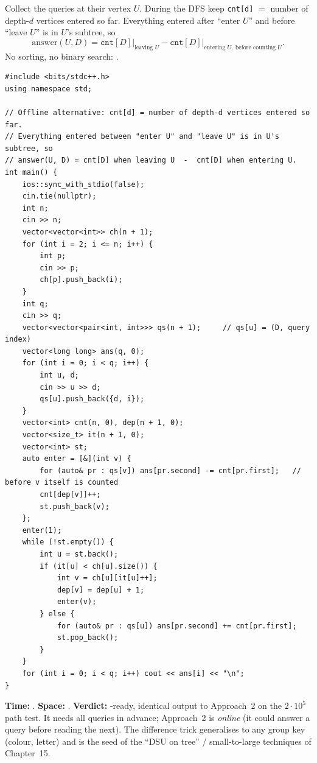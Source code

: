 \begin{alternativebox}
Collect the queries at their vertex $U$. During the DFS keep \texttt{cnt[d]} $=$ number of depth-$d$ vertices entered so far. Everything entered after ``enter $U$'' and before ``leave $U$'' is in $U$'s subtree, so
\[
    \text{answer}(U, D) = \texttt{cnt}[D]\big|_{\text{leaving } U} - \texttt{cnt}[D]\big|_{\text{entering } U,\ \text{before counting } U}.
\]
No sorting, no binary search: .

\begin{lstlisting}[style=cpp]
#include <bits/stdc++.h>
using namespace std;

// Offline alternative: cnt[d] = number of depth-d vertices entered so far.
// Everything entered between "enter U" and "leave U" is in U's subtree, so
// answer(U, D) = cnt[D] when leaving U  -  cnt[D] when entering U.
int main() {
    ios::sync_with_stdio(false);
    cin.tie(nullptr);
    int n;
    cin >> n;
    vector<vector<int>> ch(n + 1);
    for (int i = 2; i <= n; i++) {
        int p;
        cin >> p;
        ch[p].push_back(i);
    }
    int q;
    cin >> q;
    vector<vector<pair<int, int>>> qs(n + 1);     // qs[u] = (D, query index)
    vector<long long> ans(q, 0);
    for (int i = 0; i < q; i++) {
        int u, d;
        cin >> u >> d;
        qs[u].push_back({d, i});
    }
    vector<int> cnt(n, 0), dep(n + 1, 0);
    vector<size_t> it(n + 1, 0);
    vector<int> st;
    auto enter = [&](int v) {
        for (auto& pr : qs[v]) ans[pr.second] -= cnt[pr.first];   // before v itself is counted
        cnt[dep[v]]++;
        st.push_back(v);
    };
    enter(1);
    while (!st.empty()) {
        int u = st.back();
        if (it[u] < ch[u].size()) {
            int v = ch[u][it[u]++];
            dep[v] = dep[u] + 1;
            enter(v);
        } else {
            for (auto& pr : qs[u]) ans[pr.second] += cnt[pr.first];
            st.pop_back();
        }
    }
    for (int i = 0; i < q; i++) cout << ans[i] << "\n";
}
\end{lstlisting}

\begin{complexitybox}
\textbf{Time:} . \textbf{Space:} . \textbf{Verdict:} \ac{}-ready, identical output to Approach~2 on the $2\cdot10^5$ path test. It needs all queries in advance; Approach~2 is \emph{online} (it could answer a query before reading the next). The difference trick generalises to any group key (colour, letter) and is the seed of the ``DSU on tree'' / small-to-large techniques of Chapter~15.
\end{complexitybox}
\end{alternativebox}

